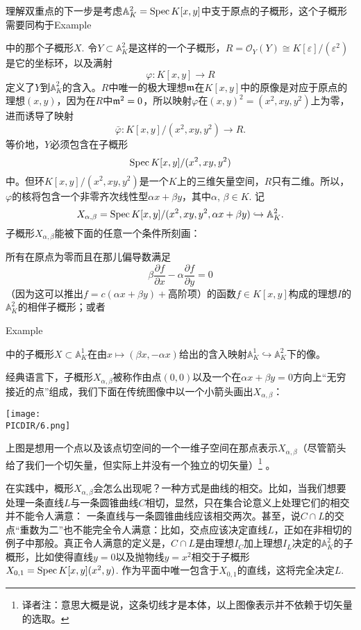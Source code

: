 \begin{exa}[双重点]
理解双重点的下一步是考虑$\mathbb{A}_K^2=\operatorname{Spec} K[x,y]$中支于原点的子概形，这个子概形需要同构于Example {{\addtocounter{thm}{-1}}\thethm{\addtocounter{thm}{1}}}中的那个子概形$X$. 令$Y\subset \mathbb{A}_K^2$是这样的一个子概形，$R=\mathscr{O}_Y(Y)\cong K[\varepsilon]/(\varepsilon^2)$是它的坐标环，以及满射
\[
	\varphi:K[x,y]\to R
\]
定义了$Y$到$\mathbb{A}_K^2$的含入。$R$中唯一的极大理想$\mathfrak{m}$在$K[x,y]$中的原像是对应于原点的理想$(x,y)$，因为在$R$中$\mathfrak{m}^2=0$，所以映射$\varphi$在$(x,y)^2=(x^2,xy,y^2)$上为零，进而诱导了映射
\[
	\bar\varphi:K[x,y]/(x^2,xy,y^2)\to R.
\]
等价地，$Y$必须包含在子概形
\[
	\operatorname{Spec} K[x,y]/(x^2,xy,y^2)
\]
中。但环$K[x,y]/(x^2,xy,y^2)$是一个$K$上的三维矢量空间，$R$只有二维。所以，$\varphi$的核将包含一个非零齐次线性型$\alpha x+\beta y$，其中$\alpha$, $\beta\in K$. 记
\[
	X_{\alpha,\beta}=\operatorname{Spec} K[x,y]/(x^2,xy,y^2,\alpha x+\beta y)\hookrightarrow \mathbb{A}_K^2.
\]
子概形$X_{\alpha,\beta}$能被下面的任意一个条件所刻画：

\begin{compactenum}[(i)]
\item 所有在原点为零而且在那儿偏导数满足
\[
	\beta\frac{\partial f}{\partial x}-\alpha\frac{\partial f}{\partial y}=0
\]
（因为这可以推出$f=c(\alpha x+\beta y)+\text{高阶项}$）的函数$f\in K[x,y]$构成的理想$I$的$\mathbb{A}^2_K$的相伴子概形；或者

\item Example {{\addtocounter{thm}{-1}}\thethm{\addtocounter{thm}{1}}}中的子概形$X\subset \mathbb{A}_K^1$在由$x\mapsto (\beta x,-\alpha x)$给出的含入映射$\mathbb{A}_K^1\hookrightarrow\mathbb{A}_K^2$下的像。
\end{compactenum}

经典语言下，子概形$X_{\alpha,\beta}$被称作由点$(0,0)$以及一个在$\alpha x+\beta y=0$方向上“无穷接近的点”组成，我们下面在传统图像中以一个小箭头画出$X_{\alpha,\beta}$：
\begin{center}\texttt{[image: \\PICDIR/6.png]}\end{center}
上图是想用一个点以及该点切空间的一个一维子空间在那点表示$X_{\alpha,\beta}$（尽管箭头给了我们一个切矢量，但实际上并没有一个独立的切矢量）\footnote{译者注：意思大概是说，这条切线才是本体，以上图像表示并不依赖于切矢量的选取。}
。
\end{exa}

\wrapa

在实践中，概形$X_{\alpha,\beta}$会怎么出现呢？一种方式是曲线的相交。比如，当我们想要处理一条直线$L$与一条圆锥曲线$C$相切，显然，只在集合论意义上处理它们的相交并不能令人满意：
一条直线与一条圆锥曲线应该相交两次。甚至，说$C\cap L$的交点“重数为二”也不能完全令人满意：比如，交点应该决定直线$L$，正如在非相切的例子中那般。真正令人满意的定义是，$C\cap L$是由理想$I_C$加上理想$I_L$决定的$\mathbb{A}_K^2$的子概形，比如使得直线$y=0$以及抛物线$y=x^2$相交于子概形$X_{0,1}=\operatorname{Spec} K[x,y](x^2,y)$. 作为平面中唯一包含于$X_{0,1}$的直线，这将完全决定$L$. 

